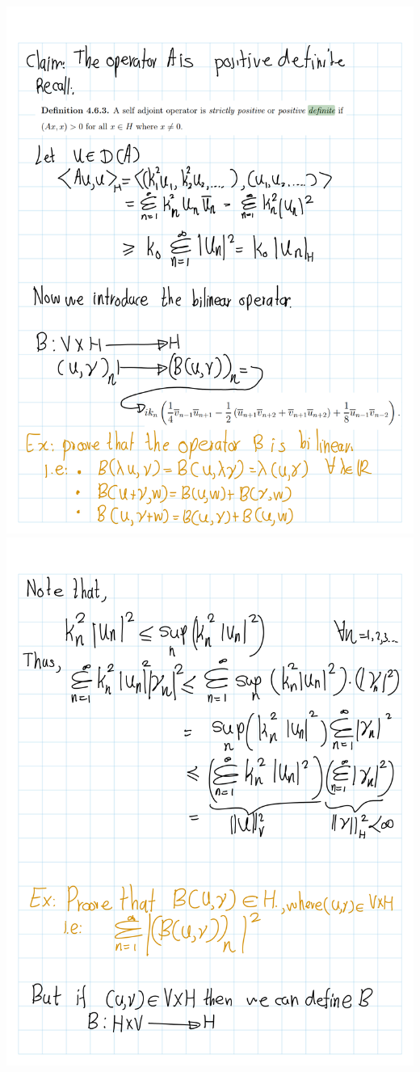 \documentclass[
]{book}
\theoremstyle{definition}
\theoremstyle{definition}
\theoremstyle{definition}
\theoremstyle{definition}
\theoremstyle{remark}
\begin{document}
\includegraphics[width=18cm,height=\textheight]{fig/Book/fig book-5.png}
\includegraphics[width=18cm,height=\textheight]{fig/Book/fig book-6.png}
\end{document}
